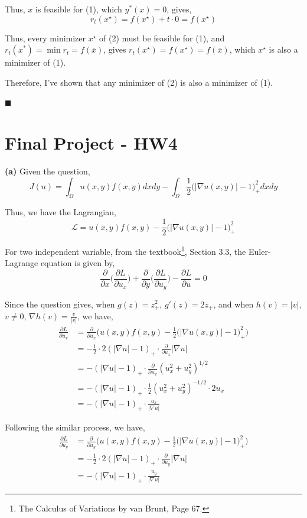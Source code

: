 \documentclass[12pt]{article}
\begin{document}
Thus, $x$ is feasible for (1), which $y^*(x)=0$, gives, 
$$r_t(x^\star)=f(x^\star)+t\cdot 0=f(x^\star)$$

Thus, every minimizer $x^\star$ of (2) must be feasible for (1), and $r_t(x^*)=\min r_t = f(\bar x)$, gives $r_t(x^\star)=f(x^\star)=f(\bar x)$, which $x^\star$ is also a minimizer of (1).

Therefore, I've shown that any minimizer of (2) is also a minimizer of (1).

\hfill $\blacksquare$

\newpage

\section{Final Project - HW4}
\textbf{(a)}
Given the question, 
$$J(u)=\int_\Omega u(x,y)f(x,y) dx dy-\int_\Omega \frac{1}{2}\big(|\nabla u(x,y)|-1\big)_+^2 dx dy$$

Thus, we have the Lagrangian, 
$$
\mathcal L = u(x,y)f(x,y) - \frac{1}{2}\big(|\nabla u(x,y)|-1\big)_+^2
$$

For two independent variable, from the textbook\footnote{The Calculus of Variations by van
Brunt, Page 67.}, Section 3.3, the Euler-Lagrange equation is given by, 
$$
\frac{\partial}{\partial x}\Big(\frac{\partial L}{\partial u_x}\Big) + \frac{\partial}{\partial y}\Big(\frac{\partial L}{\partial u_y}\Big) - \frac{\partial L}{\partial u} = 0
$$

Since the question gives, when $g(z) = z^{2}_+$, $g'(z) = 2 z_+$, and when $h(v) = |v|$, $v \neq 0$, $\nabla h(v) = \tfrac{v}{|v|}$, we have, 
\begin{align*}
	\frac{\partial L}{\partial u_x} &= \frac{\partial}{\partial u_x} \bigl(u(x,y)f(x,y) - \frac{1}{2}\big(|\nabla u(x,y)|-1\big)_+^2 \bigr) \\
	&= -\frac{1}{2} \cdot 2(| \nabla u | - 1)_+ \cdot \frac{\partial}{\partial u_x}| \nabla u | \\
	&= -(| \nabla u | - 1)_+ \cdot \frac{\partial}{\partial u_x}(u_x^2 + u_y^2)^{1/2} \\
	&= -(| \nabla u | - 1)_+ \cdot \frac{1}{2}(u_x^2+u_y^2)^{-1/2} \cdot 2u_x \\
	&= -(| \nabla u | - 1)_+ \cdot \frac{u_x}{| \nabla u |}
\end{align*}

Following the similar process, we have, 
\begin{align*}
	\frac{\partial L}{\partial u_y} &= \frac{\partial}{\partial u_y} \bigl(u(x,y)f(x,y) - \frac{1}{2}\big(|\nabla u(x,y)|-1\big)_+^2 \bigr) \\
	&= -\frac{1}{2} \cdot 2(| \nabla u | - 1)_+ \cdot \frac{\partial}{\partial u_y}| \nabla u | \\
	&= -(| \nabla u | - 1)_+ \cdot \frac{u_y}{| \nabla u |}
\end{align*}
\end{document}
